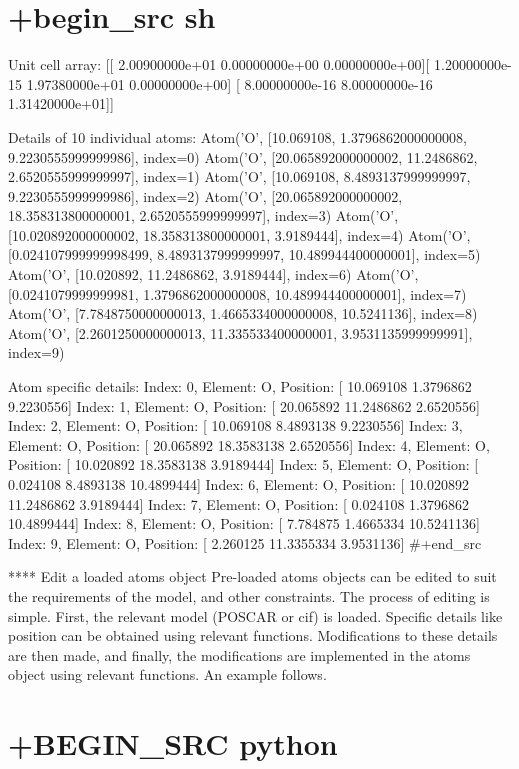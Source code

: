 \documentclass[11pt]{article}
\begin{document}
\section{+begin\_src sh}\label{begin_src-sh-2}

Unit cell array: {[}{[} 2.00900000e+01 0.00000000e+00
0.00000000e+00{]}{[} 1.20000000e-15 1.97380000e+01 0.00000000e+00{]} {[}
8.00000000e-16 8.00000000e-16 1.31420000e+01{]}{]}

Details of 10 individual atoms: Atom('O', {[}10.069108,
1.3796862000000008, 9.2230555999999986{]}, index=0) Atom('O',
{[}20.065892000000002, 11.2486862, 2.6520555999999997{]}, index=1)
Atom('O', {[}10.069108, 8.4893137999999997, 9.2230555999999986{]},
index=2) Atom('O', {[}20.065892000000002, 18.358313800000001,
2.6520555999999997{]}, index=3) Atom('O', {[}10.020892000000002,
18.358313800000001, 3.9189444{]}, index=4) Atom('O',
{[}0.024107999999998499, 8.4893137999999997, 10.489944400000001{]},
index=5) Atom('O', {[}10.020892, 11.2486862, 3.9189444{]}, index=6)
Atom('O', {[}0.0241079999999981, 1.3796862000000008,
10.489944400000001{]}, index=7) Atom('O', {[}7.7848750000000013,
1.4665334000000008, 10.5241136{]}, index=8) Atom('O',
{[}2.2601250000000013, 11.335533400000001, 3.9531135999999991{]},
index=9)

Atom specific details: Index: 0, Element: O, Position: {[} 10.069108
1.3796862 9.2230556{]} Index: 1, Element: O, Position: {[} 20.065892
11.2486862 2.6520556{]} Index: 2, Element: O, Position: {[} 10.069108
8.4893138 9.2230556{]} Index: 3, Element: O, Position: {[} 20.065892
18.3583138 2.6520556{]} Index: 4, Element: O, Position: {[} 10.020892
18.3583138 3.9189444{]} Index: 5, Element: O, Position: {[} 0.024108
8.4893138 10.4899444{]} Index: 6, Element: O, Position: {[} 10.020892
11.2486862 3.9189444{]} Index: 7, Element: O, Position: {[} 0.024108
1.3796862 10.4899444{]} Index: 8, Element: O, Position: {[} 7.784875
1.4665334 10.5241136{]} Index: 9, Element: O, Position: {[} 2.260125
11.3355334 3.9531136{]} \#+end\_src

**** Edit a loaded atoms object Pre-loaded atoms objects can be edited
to suit the requirements of the model, and other constraints. The
process of editing is simple. First, the relevant model (POSCAR or cif)
is loaded. Specific details like position can be obtained using relevant
functions. Modifications to these details are then made, and finally,
the modifications are implemented in the atoms object using relevant
functions. An example follows.

\section{+BEGIN\_SRC python}\label{begin_src-python-6}
\end{document}

